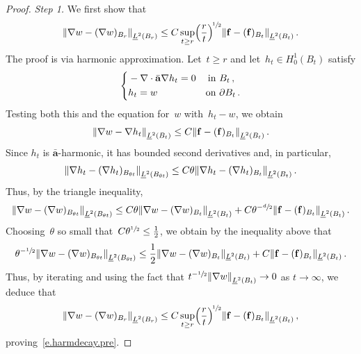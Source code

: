 \documentclass[11pt]{article} %
\numberwithin{equation}{section}
\theoremstyle{definition}
\let\originalleft\left
\let\originalright\right
\renewcommand{\left}{\mathopen{}\mathclose\bgroup\originalleft}
\renewcommand{\right}{\aftergroup\egroup\originalright}
\newcommand{\f}{\mathbf{f}}
\renewcommand{\a}{\mathbf{a}}
\newcommand{\ahom}{\bar{\a}}
\begin{document}
\begin{proof}
\emph{Step 1.} We first show that
\begin{align}  \label{e.harmdecay.pre}
\left\| \nabla w  -  (\nabla w)_{B_r} \right\|_{\underline{L}^2 \left(B_r \right)}  
\leq 
C \sup_{t \geq r}  \Bigl( \frac{r}{t} \Bigr)^{\!\sfrac12} \left\| \f - (\f)_{B_t}  \right\|_{\underline{L}^2 \left( B_{t} \right)}  \,.
\end{align}
The proof is via harmonic approximation. Let~$t \geq r$ and let~$h_t \in H_0^1(B_t)$ satisfy
\begin{equation*}
\left\{
\begin{aligned}
&-\nabla \cdot \ahom \nabla h_t = 0 & \mbox{in} & \ B_t \,, \\
& h_t = w & \mbox{on} & \ \partial B_t \,.
\end{aligned}
\right.
\end{equation*}
Testing both this and the equation for~$w$ with~$h_t - w$, we obtain 
\begin{align*}  
\left\| \nabla w - \nabla h_t  \right\|_{\underline{L}^2 \left( B_{t} \right)} 
\leq
C 
\left\| \f - (\f)_{B_t}  \right\|_{\underline{L}^2 \left( B_{t} \right)} 
\,.
\end{align*}
Since $h_t$ is $\ahom$-harmonic, it has bounded second derivatives and, in particular, 
\begin{align*}  
\left\| \nabla h_t  -  (\nabla h_t)_{B_{\theta t}} \right\|_{\underline{L}^2 \left( B_{\theta t} \right)} 
\leq 
C \theta \left\| \nabla h_t  -  (\nabla h_t)_{B_{t}} \right\|_{\underline{L}^2 \left( B_{t} \right)} 
 \,.
\end{align*}
Thus, by the triangle inequality,
\begin{align*}  
\left\| \nabla w  -  (\nabla w)_{B_{\theta t}} \right\|_{\underline{L}^2 \left( B_{\theta t} \right)} 
\leq 
C \theta \left\| \nabla w  -  (\nabla w)_{B_{t}} \right\|_{\underline{L}^2 \left( B_{t} \right)} 
+ 
C \theta^{-\sfrac d2} \left\| \f - (\f)_{B_t}  \right\|_{\underline{L}^2 \left( B_{t} \right)} 
 \,.
 \end{align*}
Choosing~$\theta$ so small that~$C \theta^{\sfrac12} \leq \frac12$, we obtain by the inequality above that
\begin{align*}  
\theta^{-\sfrac12}  \left\| \nabla w  -  (\nabla w)_{B_{\theta t}} \right\|_{\underline{L}^2 \left( B_{\theta t} \right)} 
\leq 
\frac12 \| \nabla w  -  (\nabla w)_{B_{t}} \|_{\underline{L}^2 \left( B_{t} \right)} 
+ 
C  \| \f - (\f)_{B_t}  \|_{\underline{L}^2 \left( B_{t} \right)} 
\,.
\end{align*}
Thus, by iterating and using the fact that $t^{-\sfrac12}\left\| \nabla w \right\|_{\underline{L}^2 \left( B_{t} \right)} \to 0$ as $t\to \infty$, we deduce that
\begin{align*}  
\left\| \nabla w  -  (\nabla w)_{B_{r}} \right\|_{\underline{L}^2 \left( B_{r} \right)}  
\leq 
C \sup_{t \geq r}  \Bigl( \frac{r}{t} \Bigr)^{\!\sfrac12} \left\| \f - (\f)_{B_t}  \right\|_{\underline{L}^2 \left( B_{t} \right)}  \,,
\end{align*}
proving~\eqref{e.harmdecay.pre}.
\smallskip


\end{proof}
\end{document}
